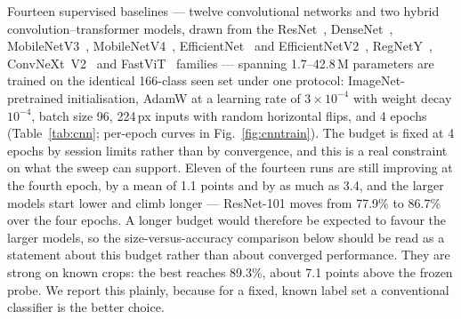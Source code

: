 \documentclass[a4paper,fleqn]{cas-dc}
\begin{document}
Fourteen supervised baselines --- twelve convolutional networks and two hybrid
convolution--transformer models, drawn from the ResNet~\citep{he2016},
DenseNet~\citep{huang2017densenet}, MobileNetV3~\citep{howard2019},
MobileNetV4~\citep{qin2024}, EfficientNet~\citep{tan2019efficientnet} and
EfficientNetV2~\citep{tan2021efficientnetv2}, RegNetY~\citep{radosavovic2020regnet},
ConvNeXt~V2~\citep{woo2023convnextv2} and FastViT~\citep{vasu2023fastvit} families ---
spanning 1.7--42.8\,M parameters are trained on the identical
166-class seen set under one protocol: ImageNet-pretrained initialisation, AdamW at a learning rate
of $3\times10^{-4}$ with weight decay $10^{-4}$, batch size 96, 224\,px inputs with random horizontal
flips, and 4 epochs (Table~\ref{tab:cnn}; per-epoch curves in Fig.~\ref{fig:cnntrain}). %
The budget is fixed at 4 epochs by session limits rather than by convergence, and this is a real
constraint on what the sweep can support. Eleven of the fourteen runs are still improving at the
fourth epoch, by a mean of 1.1 points and by as much as 3.4, and the larger models start lower and
climb longer --- ResNet-101 moves from 77.9\% to 86.7\% over the four epochs. A longer budget
would therefore be expected to favour the larger models, so the size-versus-accuracy comparison
below should be read as a statement about this budget rather than about converged performance. They are strong on known crops: the best reaches 89.3\%, about 7.1 points above the frozen
probe. We report this plainly, because for a fixed, known label set a
conventional classifier is the better choice.
\end{document}
